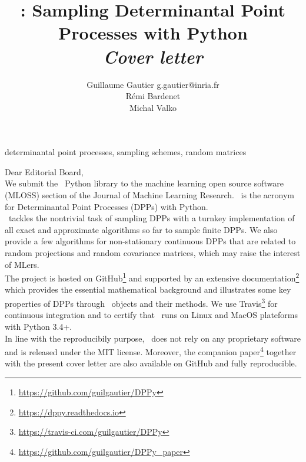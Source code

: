 \documentclass[twoside,11pt]{article}
\begin{document}
\title{\DPPy: Sampling Determinantal Point Processes with Python\\[5pt]
\textit{\normalsize Cover letter}}

\author{\name Guillaume Gautier \email g.gautier@inria.fr \\
       \name R\'emi Bardenet \\
       \name Michal Valko
}

\maketitle

\vspace{1em}

\begin{keywords}%
	determinantal point processes,
	sampling schemes,
	random matrices
\end{keywords}

\vspace{3em}

\setcounter{footnote}{3}

Dear Editorial Board,\\

We submit the \DPPy\ Python library to the machine learning open source software (MLOSS) section of the Journal of Machine Learning Research.
\DPPy\ is the acronym for Determinantal Point Processes (DPPs) with Python.\\

\DPPy\ tackles the nontrivial task of sampling DPPs with a turnkey implementation of all exact and approximate algorithms so far to sample finite DPPs.
We also provide a few algorithms for non-stationary continuous DPPs that are related to random projections and random covariance matrices, which may raise the interest of MLers.\\

The project is hosted on GitHub\footnote{\url{https://github.com/guilgautier/DPPy}} and supported by an extensive documentation\footnote{\url{https://dppy.readthedocs.io}} which provides the essential mathematical background and illustrates some key properties of DPPs through \DPPy\ objects and their methods.
We use Travis\footnote{\url{https://travis-ci.com/guilgautier/DPPy}} for continuous integration and to certify that \DPPy\ runs on Linux and MacOS plateforms with Python 3.4+.\\

In line with the reproducibily purpose, \DPPy\ does not rely on any proprietary software and is released under the MIT license.
Moreover, the companion paper\footnote{\url{https://github.com/guilgautier/DPPy_paper}} together with the present cover letter are also available on GitHub and fully reproducible.\\
\end{document}
